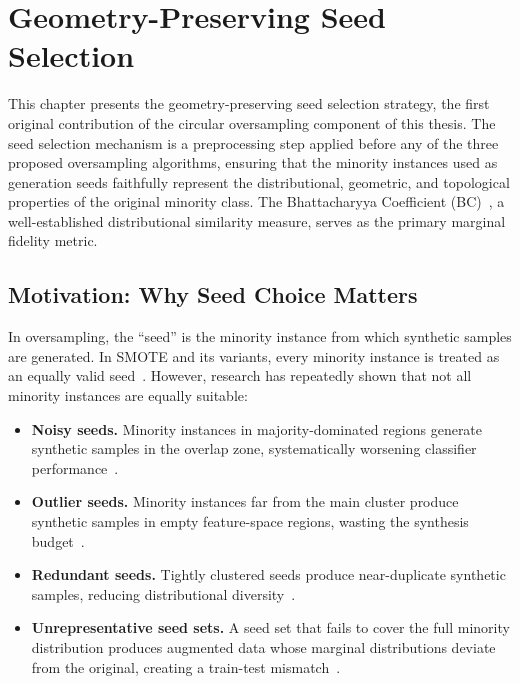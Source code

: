 
\chapter{Geometry-Preserving Seed Selection}
\label{ch:seed_selection}

This chapter presents the geometry-preserving seed selection strategy, the first original contribution of the circular oversampling component of this thesis.
The seed selection mechanism is a preprocessing step applied before any of the three proposed oversampling algorithms, ensuring that the minority instances used as generation seeds faithfully represent the distributional, geometric, and topological properties of the original minority class.
The Bhattacharyya Coefficient (BC)~\cite{bhattacharyya1943measure}, a well-established distributional similarity measure, serves as the primary marginal fidelity metric.


\section{Motivation: Why Seed Choice Matters}
\label{sec:seed:motivation}

In oversampling, the ``seed'' is the minority instance from which synthetic samples are generated.
In SMOTE and its variants, every minority instance is treated as an equally valid seed~\cite{chawla2002smote}.
However, research has repeatedly shown that not all minority instances are equally suitable:

\begin{itemize}[leftmargin=*]
  \item \textbf{Noisy seeds.} Minority instances in majority-dominated regions generate synthetic samples in the overlap zone, systematically worsening classifier performance~\cite{saez2015smote, batista2004study}.
  \item \textbf{Outlier seeds.} Minority instances far from the main cluster produce synthetic samples in empty feature-space regions, wasting the synthesis budget~\cite{han2005borderline}.
  \item \textbf{Redundant seeds.} Tightly clustered seeds produce near-duplicate synthetic samples, reducing distributional diversity~\cite{chawla2002smote, barua2014mwmote}.
  \item \textbf{Unrepresentative seed sets.} A seed set that fails to cover the full minority distribution produces augmented data whose marginal distributions deviate from the original, creating a train-test mismatch~\cite{he2009learning, fernandez2018learning}.
\end{itemize}


